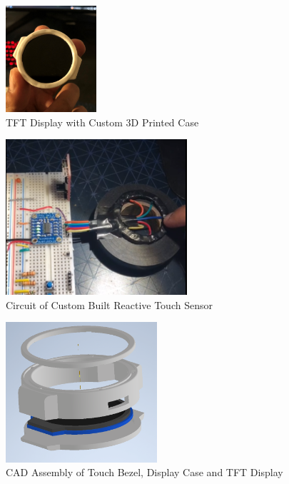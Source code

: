 \documentclass[12pt, titlepage]{article}
\begin{document}
\begin{figure}[H]
	\begin{center}
		 \includegraphics[width=0.3\textwidth]{DisplayCase}
		\caption{TFT Display with Custom 3D Printed Case}
		\label{DisplayCase} 
	\end{center}
\end{figure}

\begin{figure}[H]
	\begin{center}
		 \includegraphics[width=0.6\textwidth]{TouchSensor}
		\caption{Circuit of Custom Built Reactive Touch Sensor}
		\label{TouchSensor} 
	\end{center}
\end{figure}

\begin{figure}[H]
	\begin{center}
		 \includegraphics[width=0.5\textwidth]{WatchCAD}
		\caption{CAD Assembly of Touch Bezel, Display Case and TFT Display}
		\label{WatchCAD} 
	\end{center}
\end{figure}
\end{document}
